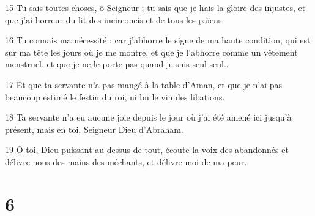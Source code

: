 \par 15 Tu sais toutes choses, ô Seigneur ; tu sais que je hais la gloire des injustes, et que j'ai horreur du lit des incirconcis et de tous les païens.
\par 16 Tu connais ma nécessité : car j'abhorre le signe de ma haute condition, qui est sur ma tête les jours où je me montre, et que je l'abhorre comme un vêtement menstruel, et que je ne le porte pas quand je suis seul seul..
\par 17 Et que ta servante n'a pas mangé à la table d'Aman, et que je n'ai pas beaucoup estimé le festin du roi, ni bu le vin des libations.
\par 18 Ta servante n'a eu aucune joie depuis le jour où j'ai été amené ici jusqu'à présent, mais en toi, Seigneur Dieu d'Abraham.
\par 19 Ô toi, Dieu puissant au-dessus de tout, écoute la voix des abandonnés et délivre-nous des mains des méchants, et délivre-moi de ma peur.

\chapter{6}

